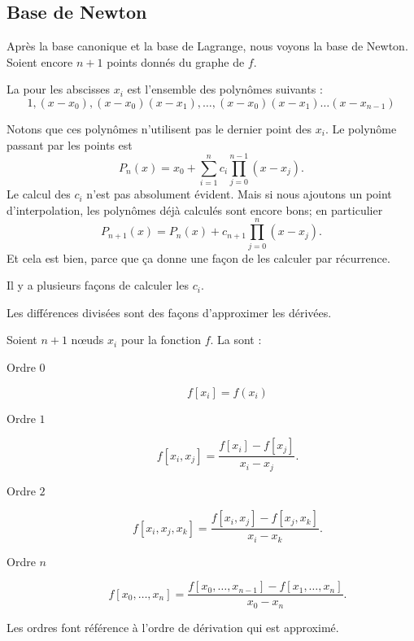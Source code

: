 \subsection{Base de Newton}

Après la base canonique et la base de Lagrange, nous voyons la base de Newton. Soient encore \( n+1\) points donnés du graphe de \( f\).

\begin{definition}
	La  pour les abscisses \( x_i\) est l'ensemble des polynômes suivants :
	\begin{equation}
		1,(x-x_0),(x-x_0)(x-x_1),\ldots,(x-x_0)(x-x_1)\ldots (x-x_{n-1})
	\end{equation}
\end{definition}
Notons que ces polynômes n'utilisent pas le dernier point des \( x_i\). Le polynôme passant par les points est
\begin{equation}
	P_n(x)=x_0+\sum_{i=1}^nc_i\prod_{j=0}^{n-1}(x-x_j).
\end{equation}
Le calcul des \( c_i\) n'est pas absolument évident. Mais si nous ajoutons un point d'interpolation, les polynômes déjà calculés sont encore bons; en particulier
\begin{equation}
	P_{n+1}(x)=P_n(x)+c_{n+1}\prod_{j=0}^{n}(x-x_j).
\end{equation}
Et cela est bien, parce que ça donne une façon de les calculer par récurrence.

Il y a plusieurs façons de calculer les \( c_i\).

Les différences divisées sont des façons d'approximer les dérivées.
\begin{definition}
	Soient \( n+1\) nœuds \( x_i\) pour la fonction \( f\). La  sont :
	\begin{description}
		\item[Ordre \( 0\)]
		      \begin{equation}
			      f[x_i]=f(x_i)
		      \end{equation}
		\item[Ordre \( 1\)]
		      \begin{equation}
			      f[x_i,x_j]=\frac{ f[x_i]-f[x_j] }{ x_i-x_j }.
		      \end{equation}
		\item[Ordre \( 2\)]
		      \begin{equation}
			      f[x_i,x_j,x_k]=\frac{ f[x_i,x_j]-f[x_j,x_k] }{ x_i-x_k }.
		      \end{equation}
		\item[Ordre \( n\)]
		      \begin{equation}
			      f[x_0,\ldots, x_n]=\frac{ f[x_0,\ldots, x_{n-1}]-f[x_1,\ldots, x_n] }{ x_0-x_n }.
		      \end{equation}
	\end{description}
\end{definition}
Les ordres font référence à l'ordre de dérivation qui est approximé.

